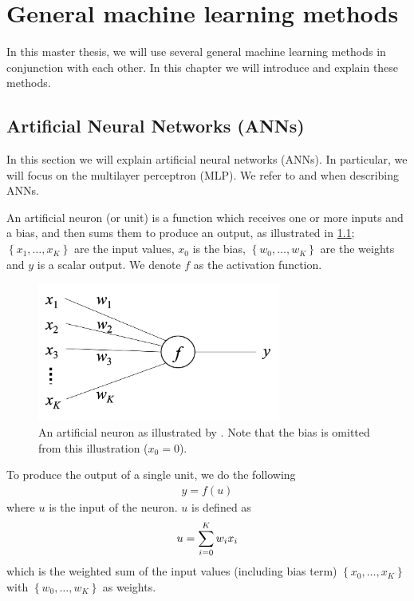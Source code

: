 \chapter{General machine learning methods}
In this master thesis, we will use several general machine learning methods in conjunction with each other. In this chapter we will introduce and explain these methods.

\section{Artificial Neural Networks (ANNs)}
In this section we will explain artificial neural networks (ANNs). In particular, we will focus on the multilayer perceptron (MLP). We refer to \cite[Chapter 11]{intro_to_ml_2014} and \cite{rong2016word2vec} when describing ANNs.

\begin{definition}
An artificial neuron (or unit) is a function which receives one or more inputs and a bias, and then sums them to produce an output, as illustrated in \cref{fig:artificial_neuron}; $\left\{ x_1, \ldots, x_K \right\}$ are the input values, $x_0$ is the bias, $\left\{ w_0, \ldots, w_K \right\}$ are the weights and $y$ is a scalar output. We denote $f$ as the activation function.
\end{definition}

\begin{figure}
    \centering
    \includegraphics[width=8cm]{thesis/figures/artificial-neuron-rong-2014.png}
    \caption{An artificial neuron as illustrated by \cite[Figure 5]{rong2016word2vec}. Note that the bias is omitted from this illustration ($x_0=0$).}
    \label{fig:artificial_neuron}
\end{figure}

To produce the output of a single unit, we do the following
\begin{align}
    y = f(u)
\end{align}
where $u$ is the input of the neuron. $u$ is defined as
\begin{align}
    u = \sum\limits_{i=0}^{K} w_i x_i
\end{align}
which is the weighted sum of the input values (including bias term) $\left\{ x_0, \ldots, x_K \right\}$ with $\left\{ w_0, \ldots, w_K \right\}$ as weights.


